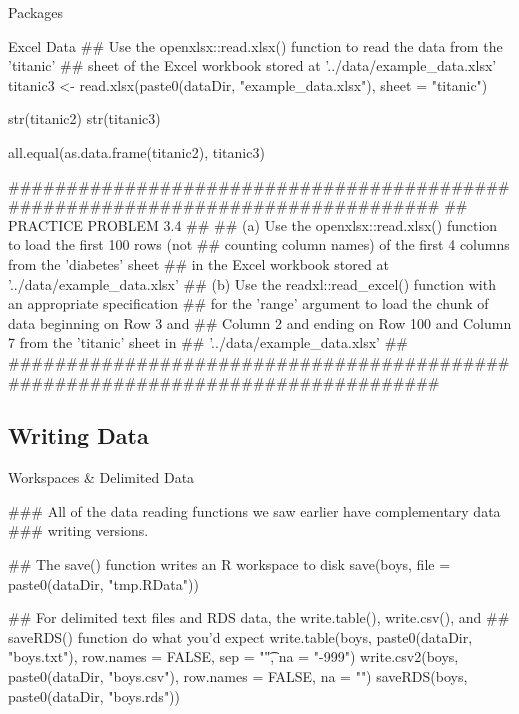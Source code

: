 \documentclass[10pt]{beamer}
\begin{document}
\begin{frame}{Packages}
\begin{frame}[fragile]{Excel Data}
## Use the openxlsx::read.xlsx() function to read the data from the 'titanic'
## sheet of the Excel workbook stored at '../data/example_data.xlsx'
titanic3 <- read.xlsx(paste0(dataDir, "example_data.xlsx"), sheet = "titanic")

str(titanic2)
str(titanic3)

all.equal(as.data.frame(titanic2), titanic3)

################################################################################
## PRACTICE PROBLEM 3.4
##
## (a) Use the openxlsx::read.xlsx() function to load the first 100 rows (not
##     counting column names) of the first 4 columns from the 'diabetes' sheet
##     in the Excel workbook stored at '../data/example_data.xlsx'
## (b) Use the readxl::read_excel() function with an appropriate specification
##     for the 'range' argument to load the chunk of data beginning on Row 3 and
##     Column 2 and ending on Row 100 and Column 7 from the 'titanic' sheet in
##     '../data/example_data.xlsx'
##
################################################################################

\end{frame}


\subsection{Writing Data}


\begin{frame}[fragile]{Workspaces \& Delimited Data}

### All of the data reading functions we saw earlier have complementary data
### writing versions.

## The save() function writes an R workspace to disk
save(boys, file = paste0(dataDir, "tmp.RData"))

## For delimited text files and RDS data, the write.table(), write.csv(), and
## saveRDS() function do what you'd expect
write.table(boys,
            paste0(dataDir, "boys.txt"),
            row.names = FALSE,
            sep = "\t",
            na = "-999")
write.csv2(boys, paste0(dataDir, "boys.csv"), row.names = FALSE, na = "")
saveRDS(boys, paste0(dataDir, "boys.rds"))

\end{frame}


\end{frame}
\end{document}
